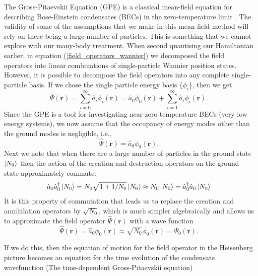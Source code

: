 \documentclass[a4paper, 10pt]{article}
\theoremstyle{plain}
\begin{document}
The Gross-Pitaevskii Equation (GPE) is a classical mean-field equation for
describing Bose-Einstein condensates (BECs) in the zero-temperature limit 
\cite{Pitaevskii2003}. The validity of some of the assumptions that we make 
in this mean-field method will rely on there being a large number of particles. 
This is something that we cannot explore with our many-body treatment. When 
second quantising our Hamiltonian earlier, in equation 
(\ref{field_operators_wannier}) we decomposed
the field operators into linear combinations of single-particle Wannier position
states. However, it is possible to decompose the field operators into any
complete single-particle basis. If we chose the single particle energy basis
$\lbrace \phi_{i} \rbrace$, then we get
\begin{equation}
    \hat{\Psi}(\mathbf{r})
    =
    \sum_{i=0}^{\infty}{\hat{a}_i\phi_{i}(\mathbf{r})}
    =
    \hat{a}_{0} \phi_{0}(\mathbf{r}) +
    \sum_{i=1}^{\infty}{\hat{a}_i\phi_{i}(\mathbf{r})}.
\end{equation}
Since the GPE is a tool for investigating near-zero temperature BECs (very low
energy systems), we now assume that the occupancy of energy modes other than
the ground modes is negligible, i.e.,
\begin{equation}
    \hat{\Psi}(\mathbf{r}) = \hat{a}_{0} \phi_{0}(\mathbf{r}).
\end{equation}
Next we note that when there are a large number of particles in the ground state
$\ket{N_{0}}$ then the action of the creation and destruction operators on the
ground state approximately commute:
\begin{equation}
    \hat{a}_{0} \hat{a}^{\dagger}_{0} \ket{N_{0}}
    =
    N_{0} \sqrt{1+1/N_{0}} \ket{N_{0}}
    \approx
    N_{0} \ket{N_{0}}
    =
    \hat{a}^{\dagger}_{0} \hat{a}_{0} \ket{N_{0}}
\end{equation}
It is this property of commutation that leads us to replace the creation and
annihilation operators by $\sqrt{N_{0}}$, which is much simpler algebraically 
and allows us to approximate the field operator $\hat{\Psi}(\mathbf{r})$ with 
a wave function
\begin{equation}
    \hat{\Psi}(\mathbf{r})
    =
    \hat{a}_{0} \phi_{0}(\mathbf{r}) \approx \sqrt{N_{0}} \phi_{0}(\mathbf{r})
    =
    \Psi_{0}(\mathbf{r}).
\end{equation}

If we do this, then the equation of motion for the field operator in the 
Heisenberg picture becomes an equation for the time evolution of the 
condensate wavefunction (The time-dependent Gross-Pitaevskii equation)
\end{document}

